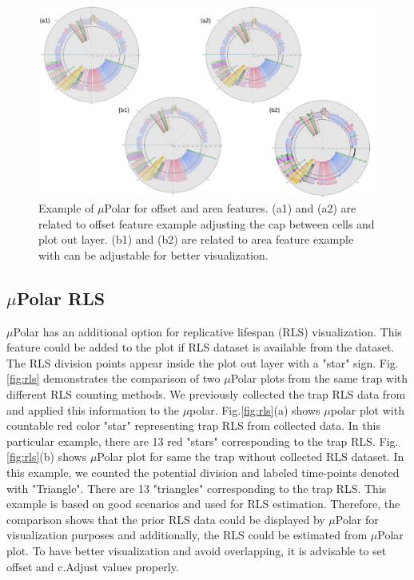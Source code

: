 \documentclass[conference]{IEEEtran}
\begin{document}
\begin{figure}
\centering
\includegraphics[width=\textwidth,height=10 cm]{Patterns/area_offset.pdf}
\caption{ Example of $\mu$Polar for offset and area features. (a1) and (a2) are related to offset feature example adjusting the cap between cells and plot out layer. (b1) and (b2) are related to area feature example with can be adjustable for better visualization.}
\label{fig:areaoff}
\end{figure}



\subsection{$\mu$Polar RLS}

$\mu$Polar has an additional option for replicative lifespan (RLS) visualization. This feature could be added to the plot if RLS dataset is available from the dataset. The RLS division points appear inside the plot out layer with a "star" sign. Fig.\ref{fig:rls} demonstrates the comparison of two $\mu$Polar plots from the same trap with different RLS counting methods. We previously collected the trap RLS data from \cite{ref02.2} and applied this information to the $\mu$polar. Fig.\ref{fig:rls}(a) shows $\mu$polar plot with countable red color "star" representing trap RLS from collected data. In this particular example, there are 13 red "stars" corresponding to the trap RLS. Fig.\ref{fig:rls}(b) shows $\mu$Polar plot for same the trap without collected RLS dataset. In this example, we counted the potential division and labeled time-points denoted with "Triangle". There are 13 "triangles" corresponding to the trap RLS. This example is based on good scenarios and used for RLS estimation. Therefore, the comparison shows that the prior RLS data could be displayed by $\mu$Polar for visualization purposes and additionally, the RLS could be estimated from $\mu$Polar plot. To have better visualization and avoid overlapping, it is advisable to set offset and c.Adjust values properly.       
\end{document}
